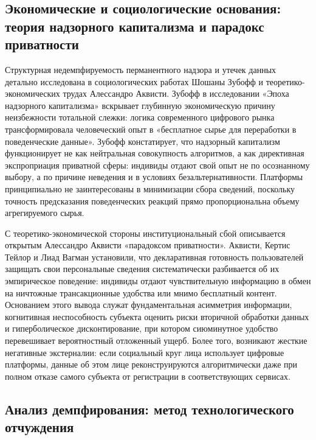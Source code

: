 \documentclass[12pt,a4paper]{article}
\begin{document}
\subsection{Экономические и социологические основания: теория надзорного капитализма и парадокс приватности}

Структурная недемпфируемость перманентного надзора и утечек данных 
детально исследована в социологических работах Шошаны Зубофф и 
теоретико-экономических трудах Алессандро Аквисти. Зубофф в 
исследовании «Эпоха надзорного капитализма» вскрывает глубинную 
экономическую причину неизбежности тотальной слежки: логика 
современного цифрового рынка трансформировала человеческий опыт в 
«бесплатное сырье для переработки в поведенческие данные». Зубофф 
констатирует, что надзорный капитализм функционирует не как нейтральная 
совокупность алгоритмов, а как директивная экспроприация приватной 
сферы: индивиды отдают свой опыт не по осознанному выбору, а по причине 
неведения и в условиях безальтернативности. Платформы принципиально не 
заинтересованы в минимизации сбора сведений, поскольку точность 
предсказания поведенческих реакций прямо пропорциональна объему 
агрегируемого сырья.

С теоретико-экономической стороны институциональный сбой описывается 
открытым Алессандро Аквисти «парадоксом приватности». Аквисти, 
Кертис Тейлор и Лиад Вагман установили, что декларативная готовность 
пользователей защищать свои персональные сведения систематически 
разбивается об их эмпирическое поведение: индивиды отдают 
чувствительную информацию в обмен на ничтожные трансакционные 
удобства или мнимо бесплатный контент. Основанием этого вывода 
служат фундаментальная асимметрия информации, когнитивная неспособность 
субъекта оценить риски вторичной обработки данных и гиперболическое 
дисконтирование, при котором сиюминутное удобство перевешивает 
вероятностный отложенный ущерб. Более того, возникают жесткие 
негативные экстерналии: если социальный круг лица использует цифровые 
платформы, данные об этом лице реконструируются алгоритмически даже 
при полном отказе самого субъекта от регистрации в соответствующих 
сервисах.

\subsection{Анализ демпфирования: метод технологического отчуждения}
\end{document}
